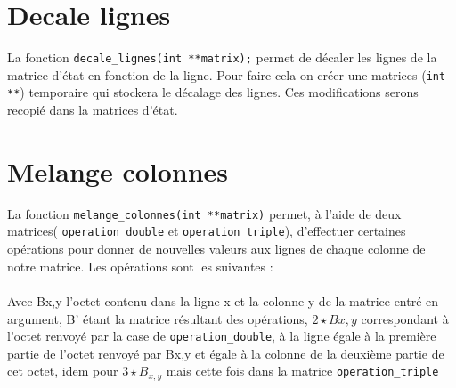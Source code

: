 \documentclass[10pt, a4paper]{report}
\begin{document}
	\section{Decale lignes}
	
	La fonction \verb|decale_lignes(int **matrix);| permet de décaler les lignes de la matrice d'état en fonction de la ligne. Pour faire cela on créer une matrices (\verb|int **|) temporaire qui stockera le décalage des lignes. Ces modifications serons recopié dans la matrices d'état.
	
	\section{Melange colonnes}
	
	La fonction \verb|melange_colonnes(int **matrix)| permet, à l'aide de deux matrices( \verb|operation_double| et \verb|operation_triple|), d'effectuer certaines opérations pour donner de nouvelles valeurs aux lignes de chaque colonne de notre matrice. Les opérations sont les suivantes : \\\\
	Avec B{x,y} l'octet contenu dans la ligne x et la colonne y de la matrice entré en argument, B' étant la matrice résultant des opérations,
	\begin{math}
		2\star B{x,y}  
	\end{math}
	correspondant à l'octet renvoyé par la case de \verb|operation_double|, à la ligne égale à la première partie de l'octet renvoyé par B{x,y} et égale à la colonne de la deuxième partie de cet octet, idem pour 
	\begin{math}
		3\star B_{x,y} 
	\end{math}
	mais cette fois dans la matrice \verb|operation_triple|
\end{document}
